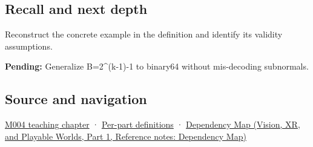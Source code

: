 \subsection{Recall and next depth}\label{appendix-2fae058c82e1-recall-and-next-depth}

\hypertarget{appendix-2fae058c82e1-recall-and-next-depth}{}

Reconstruct the concrete example in the definition and identify its validity assumptions.

\textbf{Pending:} Generalize B=2\^{}(k-1)-1 to binary64 without mis-decoding subnormals.

\subsection{Source and navigation}\label{appendix-2fae058c82e1-source-and-navigation}

\hypertarget{appendix-2fae058c82e1-source-and-navigation}{}

\hyperref[01-foundations-i-ch001-a-stretching-ruler-for-real-valued-quantities]{M004 teaching chapter} · \hyperref[appendix-fd090d982a15-m004---parts-61-76]{Per-part definitions} · \href{../07-Vision-XR-and-Playable-Worlds-P01/main.pdf\#nameddest=appendix-4ad47bdd269a}{Dependency Map (Vision, XR, and Playable Worlds, Part 1, Reference notes: Dependency Map)}
